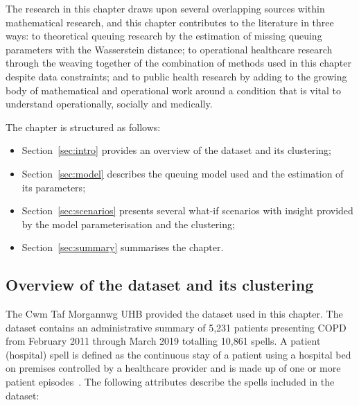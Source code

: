 The research in this chapter draws upon several overlapping sources within
mathematical research, and this chapter contributes to the literature in three
ways: to theoretical queuing research by the estimation of missing queuing
parameters with the Wasserstein distance; to operational healthcare research
through the weaving together of the combination of methods used in this chapter
despite data constraints; and to public health research by adding to the growing
body of mathematical and operational work around a condition that is vital to
understand operationally, socially and medically.

The chapter is structured as follows:

\begin{itemize}
    \item Section~\ref{sec:intro} provides an overview of the dataset and its
        clustering;
    \item Section~\ref{sec:model} describes the queuing model used and the
        estimation of its parameters;
    \item Section~\ref{sec:scenarios} presents several what-if scenarios with
        insight provided by the model parameterisation and the clustering;
    \item Section~\ref{sec:summary} summarises the chapter.
\end{itemize}


\subsection{Overview of the dataset and its clustering}\label{subsec:overview}

The Cwm Taf Morgannwg UHB provided the dataset used in this chapter. The
dataset contains an administrative summary of 5,231 patients presenting COPD
from February 2011 through March 2019 totalling 10,861 spells. A patient
(hospital) spell is defined as the continuous stay of a patient using a hospital
bed on premises controlled by a healthcare provider and is made up of one or
more patient episodes~\cite{NHS:spell}. The following attributes describe the
spells included in the dataset:

